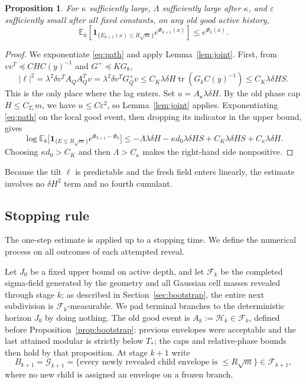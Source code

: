 \documentclass[11pt]{article}
\newtheorem{proposition}[proposition]{Proposition}
\theoremstyle{definition}
\theoremstyle{remark}
\numberwithin{equation}{section}
\newcommand{\E}{\mathbb E}
\newcommand{\F}{\mathcal F}
\newcommand{\tr}{\operatorname{tr}}
\newcommand{\one}{\mathbf 1}
\begin{document}
\begin{proposition}\label{prop:mgf}
For $\kappa$ sufficiently large, $\Lambda$ sufficiently large
after $\kappa$, and $\varepsilon$ sufficiently small after all fixed
constants, on any old good active history,
\begin{equation}\label{eq:onestep}
 \E_k\left[\one_{\{E_{k+1}(x)\le R\sqrt m\}}
          e^{\Phi_{k+1}(x)}\right]
 \le e^{\Phi_k(x)}.
\end{equation}
\end{proposition}
\begin{proof}
We exponentiate \eqref{eq:path} and apply Lemma~\ref{lem:joint}.
First, from $vv^T\preceq CH C(y)^{-1}$ and $G^+\preceq KG_k$,
\[
 |\ell|^2=\lambda^2\delta v^TA_QA_Q^Tv
 =\lambda^2\delta v^TG_Q^+v
 \le C_K\lambda\delta H\tr(G_kC(y)^{-1})
 \le C_K\lambda\delta HS.
\]
This is the only place where the lag enters.
Set $u=A_\kappa\lambda\delta H$. By the old phase cap
$H\le C_{T_*}m$, we have $u\le C\varepsilon^2$,
so Lemma~\ref{lem:joint} applies.
Exponentiating \eqref{eq:path} on the local good event,
then dropping its indicator in the upper bound, gives
\[
 \log\E_k\bigl[
  \one_{\{E\le R\sqrt m\}}e^{\Phi_{k+1}-\Phi_k}\bigr]
 \le -\Lambda\lambda\delta H
       -\kappa d_0\lambda\delta HS
       +C_K\lambda\delta HS+C_\kappa\lambda\delta H.
\]
Choosing $\kappa d_0>C_K$ and then $\Lambda>C_\kappa$ makes the
right-hand side nonpositive.
\end{proof}

Because the tilt $\ell$ is predictable and the fresh field enters
linearly, the estimate involves no $\delta H^2$ term and no fourth
cumulant.

\subsection{Stopping rule}
The one-step estimate is applied up to a stopping time. We define
the numerical process on all outcomes of each attempted reveal.

Let $J_0$ be a fixed upper bound on active depth, and let $\F_k$
be the completed sigma-field generated by the geometry and all
Gaussian cell masses revealed through stage $k$; as described in
Section~\ref{sec:bootstrap}, the entire next subdivision is
$\F_k$-measurable. We pad terminal branches to the deterministic
horizon $J_0$ by doing nothing. The old good event is
$A_k:=\mathcal H_k\in\F_k$, defined before
Proposition~\ref{prop:bootstrap}: previous envelopes were acceptable
and the last attained modular is strictly below $T_*$; the caps and
relative-phase bounds then hold by that proposition. At stage $k+1$
write
\[
 B_{k+1}=\mathcal G_{k+1}
 =\{\text{every newly revealed child envelope is }\le R\sqrt m\}
 \in\F_{k+1},
\]
where no new child is assigned an envelope on a frozen branch.
\end{document}

